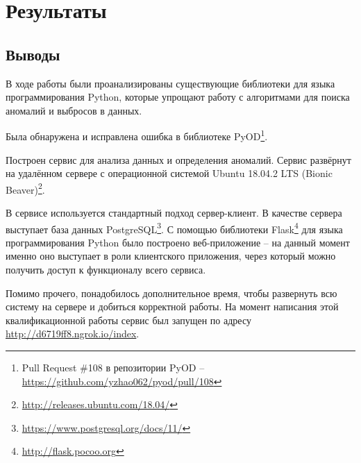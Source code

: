 \chapter{Результаты} \label{ch:ch4}

\section{Выводы} \label{ch:ch4/sect1}

В ходе работы были проанализированы существующие библиотеки для языка программирования Python, которые упрощают работу с алгоритмами для поиска аномалий и выбросов в данных.

Была обнаружена и исправлена ошибка в библиотеке PyOD\footnote{Pull Request \#108 в репозитории PyOD -- \url{https://github.com/yzhao062/pyod/pull/108}}.

Построен сервис для анализа данных и определения аномалий. Сервис развёрнут на удалённом сервере с операционной системой Ubuntu 18.04.2 LTS (Bionic Beaver)\footnote{\url{http://releases.ubuntu.com/18.04/}}.

В сервисе используется стандартный подход сервер-клиент. В качестве сервера выступает база данных PostgreSQL\footnote{\url{https://www.postgresql.org/docs/11/}}. С помощью библиотеки Flask\footnote{\url{http://flask.pocoo.org}} для языка программирования Python было построено веб-приложение -- на данный момент именно оно выступает в роли клиентского приложения, через который можно получить доступ к функционалу всего сервиса.

Помимо прочего, понадобилось дополнительное время, чтобы развернуть всю систему на сервере и добиться корректной работы. На момент написания этой квалификационной работы сервис был запущен по адресу \url{http://d6719ff8.ngrok.io/index}.

\clearpage